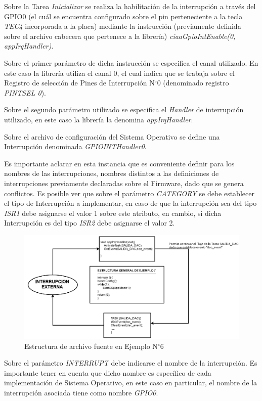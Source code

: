 \documentclass[12pt,letterpaper]{article}
\begin{document}
Sobre la Tarea \textit{Inicializar} se realiza la habilitación de la interrupción a través del GPIO0 (el cuál se encuentra configurado sobre el pin perteneciente a la tecla \textit{TEC4} incorporada a la placa) mediante la instrucción (previamente definida sobre el archivo cabecera que pertenece a la librería) \textit{ciaaGpioIntEnable(0, appIrqHandler)}.

Sobre el primer parámetro de dicha instrucción se especifica el canal utilizado. En este caso la librería utiliza el canal 0, el cual indica que se trabaja sobre el Registro de selección de Pines de Interrupción N$^{\circ}$0 (denominado registro \textit{PINTSEL 0}).

Sobre el segundo parámetro utilizado se especifica el \textit{Handler} de interrupción utilizado, en este caso la librería la denomina \textit{appIrqHandler}.

Sobre el archivo de configuración del Sistema Operativo se define una Interrupción denominada \textit{GPIOINTHandler0}.

Es importante aclarar en esta instancia que es conveniente definir para los nombres de las interrupciones, nombres distintos a las definiciones de interrupciones previamente declaradas sobre el Firmware, dado que se genera conflictos. Es posible ver que sobre el parámetro \textit{CATEGORY} se debe establecer el tipo de Interrupción a implementar, en caso de que la interrupción sea del tipo \textit{ISR1} debe asignarse el valor 1 sobre este atributo, en cambio, si dicha Interrupción es del tipo \textit{ISR2} debe asignarse el valor 2.
\begin{figure}[H]
\centering
\includegraphics[width=12 cm]{figuras/f37.png}
\caption{Estructura de archivo fuente en Ejemplo N$^{\circ}$6}
\label{estructuraej6}
\end{figure}
Sobre el parámetro \textit{INTERRUPT} debe indicarse el nombre de la interrupción. Es importante tener en cuenta que dicho nombre es específico de cada implementación de Sistema Operativo, en este caso en particular, el nombre de la interrupción asociada tiene como nombre \textit{GPIO0}.
\end{document}

